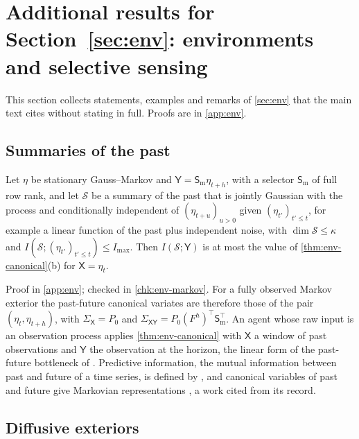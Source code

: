 \section{Additional results for \texorpdfstring{Section~\ref{sec:env}}{Section 14}: environments and selective sensing}\label{sup:env}

This section collects statements, examples and remarks of \cref{sec:env} that the main text cites without stating in full. Proofs are in \cref{app:env}.

\subsection{Summaries of the past}\label{sup:env-summaries-of-the-past}

\begin{lemma}\label{lem:env-markov}
Let $\eta$ be stationary Gauss--Markov and $\mathsf Y=\mathsf S_{\mathrm m}\eta_{t+h}$, with a selector $\mathsf S_{\mathrm m}$ of full row rank, and let $\mathcal S$ be a summary of the past that is jointly Gaussian with the process and conditionally independent of $(\eta_{t+u})_{u>0}$ given $(\eta_{t'})_{t'\le t}$, for example a linear function of the past plus independent noise, with $\dim\mathcal S\le\kappa$ and $I(\mathcal S;(\eta_{t'})_{t'\le t})\le I_{\max}$. Then $I(\mathcal S;\mathsf Y)$ is at most the value of \cref{thm:env-canonical}(b) for $\mathsf X=\eta_t$.
\end{lemma}

Proof in \cref{app:env}; checked in \cref{chk:env-markov}. For a fully observed Markov exterior the past-future canonical variates are therefore those of the pair $(\eta_t,\eta_{t+h})$, with $\Sigma_{\mathsf X}=P_0$ and $\Sigma_{\mathsf X\mathsf Y}=P_0(F^h)^\top\mathsf S_{\mathrm m}^\top$. An agent whose raw input is an observation process applies \cref{thm:env-canonical} with $\mathsf X$ a window of past observations and $\mathsf Y$ the observation at the horizon, the linear form of the past-future bottleneck of \citet{creutzig2009past}. Predictive information, the mutual information between past and future of a time series, is defined by \citet{bialek2001predictability}, and canonical variables of past and future give Markovian representations \citep{akaike1975markovian}, a work cited from its record.

\subsection{Diffusive exteriors}\label{sup:env-diffusive-exteriors}

